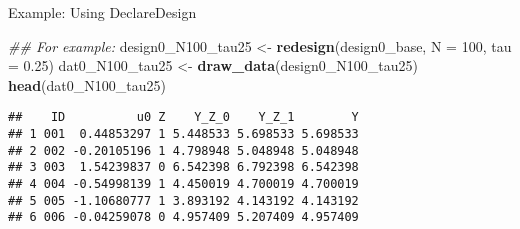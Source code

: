 \documentclass[
  ignorenonframetext,
]{beamer}
\newenvironment{Shaded}{\begin{snugshade}}{\end{snugshade}}
\newcommand{\CommentTok}[1]{\textcolor[rgb]{0.56,0.35,0.01}{\textit{#1}}}
\newcommand{\DataTypeTok}[1]{\textcolor[rgb]{0.13,0.29,0.53}{#1}}
\newcommand{\DecValTok}[1]{\textcolor[rgb]{0.00,0.00,0.81}{#1}}
\newcommand{\FloatTok}[1]{\textcolor[rgb]{0.00,0.00,0.81}{#1}}
\newcommand{\KeywordTok}[1]{\textcolor[rgb]{0.13,0.29,0.53}{\textbf{#1}}}
\newcommand{\NormalTok}[1]{#1}
\newcommand{\StringTok}[1]{\textcolor[rgb]{0.31,0.60,0.02}{#1}}
\begin{document}
\begin{frame}[fragile]{Example: Using DeclareDesign}
\protect\hypertarget{example-using-declaredesign-1}{}
\begin{Shaded}
\begin{Highlighting}[]
\CommentTok{\#\# For example:}
\NormalTok{design0\_N100\_tau25 \textless{}{-}}\StringTok{ }\KeywordTok{redesign}\NormalTok{(design0\_base,}
    \DataTypeTok{N =} \DecValTok{100}\NormalTok{, }\DataTypeTok{tau =} \FloatTok{0.25}\NormalTok{)}
\NormalTok{dat0\_N100\_tau25 \textless{}{-}}\StringTok{ }\KeywordTok{draw\_data}\NormalTok{(design0\_N100\_tau25)}
\KeywordTok{head}\NormalTok{(dat0\_N100\_tau25)}
\end{Highlighting}
\end{Shaded}

\begin{verbatim}
##    ID          u0 Z    Y_Z_0    Y_Z_1        Y
## 1 001  0.44853297 1 5.448533 5.698533 5.698533
## 2 002 -0.20105196 1 4.798948 5.048948 5.048948
## 3 003  1.54239837 0 6.542398 6.792398 6.542398
## 4 004 -0.54998139 1 4.450019 4.700019 4.700019
## 5 005 -1.10680777 1 3.893192 4.143192 4.143192
## 6 006 -0.04259078 0 4.957409 5.207409 4.957409
\end{verbatim}
\end{frame}
\end{document}
